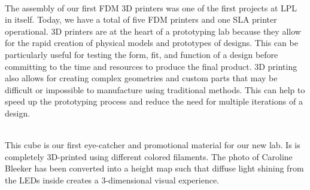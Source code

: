 \documentclass{report}
\begin{document}
 \\

The assembly of our first FDM 3D printers was one of the first projects at LPL in itself. Today, we have a total of five FDM printers and one SLA printer operational. 
3D printers are at the heart of a prototyping lab because they allow for the rapid creation of physical models and prototypes of designs. This can be particularly useful for testing the form, fit, and function of a design before committing to the time and resources to produce the final product. 3D printing also allows for creating complex geometries and custom parts that may be difficult or impossible to manufacture using traditional methods. This can help to speed up the prototyping process and reduce the need for multiple iterations of a design. 

\clearpage
\begin{figure}
    \centering
\end{figure}
\clearpage

 \\

This cube is our first eye-catcher and promotional material for our new lab. Is is completely 3D-printed using different colored filaments. The photo of Caroline Bleeker has been converted into a height map such that diffuse light shining from the LEDs inside creates a 3-dimensional visual experience. 
\end{document}

